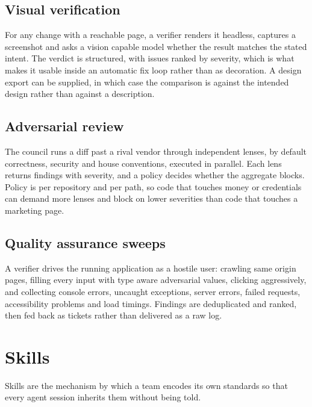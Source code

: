 \subsection{Visual verification}

For any change with a reachable page, a verifier renders it headless, captures a screenshot
and asks a vision capable model whether the result matches the stated intent. The verdict is
structured, with issues ranked by severity, which is what makes it usable inside an automatic
fix loop rather than as decoration. A design export can be supplied, in which case the
comparison is against the intended design rather than against a description.

\subsection{Adversarial review}

The council runs a diff past a rival vendor through independent lenses, by default
correctness, security and house conventions, executed in parallel. Each lens returns findings
with severity, and a policy decides whether the aggregate blocks. Policy is per repository and
per path, so code that touches money or credentials can demand more lenses and block on lower
severities than code that touches a marketing page.

\subsection{Quality assurance sweeps}

A verifier drives the running application as a hostile user: crawling same origin pages,
filling every input with type aware adversarial values, clicking aggressively, and collecting
console errors, uncaught exceptions, server errors, failed requests, accessibility problems
and load timings. Findings are deduplicated and ranked, then fed back as tickets rather than
delivered as a raw log.

\section{Skills}

Skills are the mechanism by which a team encodes its own standards so that every agent
session inherits them without being told.

